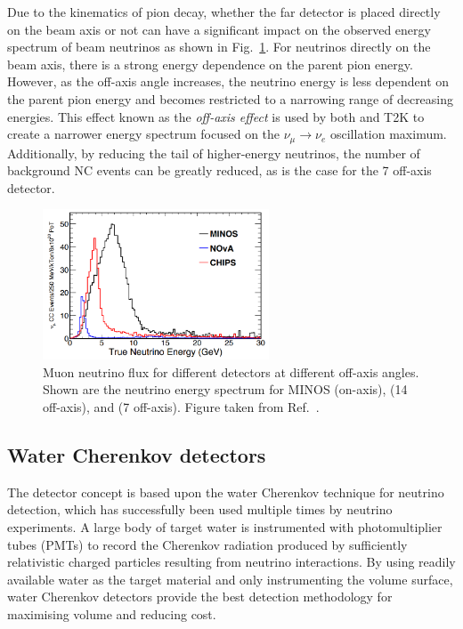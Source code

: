 Due to the kinematics of pion decay, whether the far detector is placed directly on the beam axis
or not can have a significant impact on the observed energy spectrum of beam neutrinos as shown in
Fig.~\ref{fig:numi_axis}. For neutrinos directly on the beam axis, there is a strong energy
dependence on the parent pion energy. However, as the off-axis angle increases, the neutrino
energy is less dependent on the parent pion energy and becomes restricted to a narrowing range of
decreasing energies. This effect known as the \emph{off-axis effect} is used by both \nova and T2K
to create a narrower energy spectrum focused on the $\nu_{\mu}\rightarrow\nu_{e}$ oscillation
maximum. Additionally, by reducing the tail of higher-energy neutrinos, the number of background
NC events can be greatly reduced, as is the case for the \unit{7}{} off-axis
\chipsfive detector.

\begin{figure} %
    \includegraphics[width=0.6\textwidth]{diagrams/4-chips/numi_axis.png}
    \caption[Muon neutrino flux for different \numi detectors at different off-axis angles.]
    {Muon neutrino flux for different \numi detectors at different off-axis angles. Shown are the
        neutrino energy spectrum for MINOS (on-axis), \nova (\unit{14}{} off-axis),
        and \chipsfive (\unit{7}{} off-axis). Figure taken from
        Ref.~\cite{adamson2013}.}
    \label{fig:numi_axis}
\end{figure}

\subsection{Water Cherenkov detectors} %
\label{sec:chips_concept_cherenkov} %

The \chips detector concept is based upon the water Cherenkov technique for neutrino detection,
which has successfully been used multiple times by neutrino experiments. A large body of target
water is instrumented with photomultiplier tubes (PMTs) to record the Cherenkov radiation produced
by sufficiently relativistic charged particles resulting from neutrino interactions. By using
readily available water as the target material and only instrumenting the volume surface, water
Cherenkov detectors provide the best detection methodology for maximising volume and reducing
cost.

